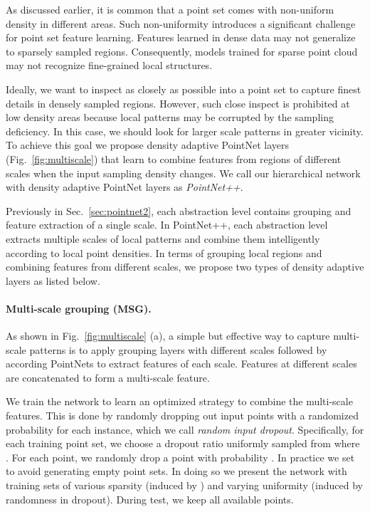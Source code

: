 \documentclass{article}
\begin{document}
As discussed earlier, it is common that a point set comes with non-uniform density in different areas. Such non-uniformity introduces a significant challenge for point set feature learning. Features learned in dense data may not generalize to sparsely sampled regions. Consequently, models trained for sparse point cloud may not recognize fine-grained local structures.


Ideally, we want to inspect as closely as possible into a point set to capture finest details in densely sampled regions. However, such close inspect is prohibited at low density areas because local patterns may be corrupted by the sampling deficiency. In this case, we should look for larger scale patterns in greater vicinity. To achieve this goal we propose density adaptive PointNet layers (Fig.~\ref{fig:multiscale}) that learn to combine features from regions of different scales when the input sampling density changes.
We call our hierarchical network with density adaptive PointNet layers as \emph{PointNet++}.


Previously in Sec.~\ref{sec:pointnet2}, each abstraction level contains grouping and feature extraction of a single scale.
In PointNet++, each abstraction level extracts multiple scales of local patterns and combine them intelligently according to local point densities. In terms of grouping local regions and combining features from different scales, we propose two types of density adaptive layers as listed below.\vspace{-0.3cm}
\paragraph{Multi-scale grouping (MSG).} As shown in Fig.~\ref{fig:multiscale} (a), a simple but effective way to capture multi-scale patterns is to apply grouping layers with different scales followed by according PointNets to extract features of each scale. Features at different scales are concatenated to form a multi-scale feature.

We train the network to learn an optimized strategy to combine the multi-scale features. This is done by randomly dropping out input points with a randomized probability for each instance, which we call \emph{random input dropout}. Specifically, for each training point set, we choose a dropout ratio  uniformly sampled from  where . For each point, we randomly drop a point with probability . In practice we set  to avoid generating empty point sets. In doing so we present the network with training sets of various sparsity (induced by ) and varying uniformity (induced by randomness in dropout). During test, we keep all available points.
\end{document}
